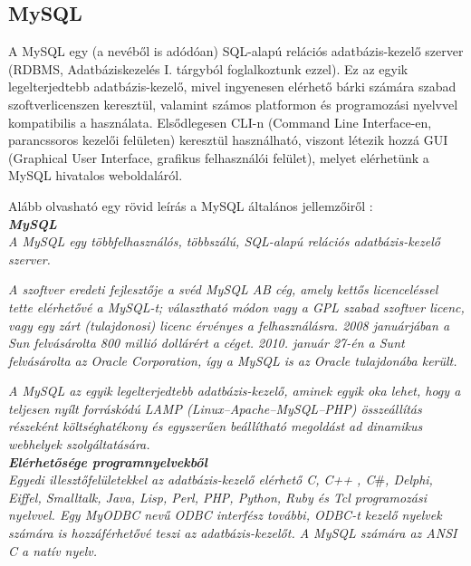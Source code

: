 
\subsection{MySQL}

A MySQL egy (a nevéből is adódóan) SQL-alapú relációs adatbázis-kezelő szerver (RDBMS, Adatbáziskezelés I. tárgyból foglalkoztunk ezzel).
Ez az egyik legelterjedtebb adatbázis-kezelő, mivel ingyenesen elérhető bárki számára szabad szoftverlicenszen keresztül, valamint számos platformon és programozási nyelvvel kompatibilis a használata.
Elsődlegesen CLI-n (Command Line Interface-en, parancssoros kezelői felületen) keresztül használható, viszont létezik hozzá GUI (Graphical User Interface, grafikus felhasználói felület), melyet elérhetünk a MySQL hivatalos weboldaláról.

Alább olvasható egy rövid leírás a MySQL általános jellemzőiről \cite{mysqlcikk}:\\

\noindent\textit{\textbf{\large{MySQL}}}\\

\textit{A MySQL egy többfelhasználós, többszálú, SQL-alapú relációs adatbázis-kezelő szerver.}

\textit{A szoftver eredeti fejlesztője a svéd MySQL AB cég, amely kettős licenceléssel tette elérhetővé a MySQL-t; választható módon vagy a GPL szabad szoftver licenc, vagy egy zárt (tulajdonosi) licenc érvényes a felhasználásra. 2008 januárjában a Sun felvásárolta 800 millió dollárért a céget. 2010. január 27-én a Sunt felvásárolta az Oracle Corporation, így a MySQL is az Oracle tulajdonába került.}

\textit{A MySQL az egyik legelterjedtebb adatbázis-kezelő, aminek egyik oka lehet, hogy a teljesen nyílt forráskódú LAMP (Linux–Apache–MySQL–PHP) összeállítás részeként költséghatékony és egyszerűen beállítható megoldást ad dinamikus webhelyek szolgáltatására.}\\

\noindent\textit{\textbf{Elérhetősége programnyelvekből}}\\

\textit{Egyedi illesztőfelületekkel az adatbázis-kezelő elérhető C, C++ , C}\#\textit{, Delphi, Eiffel, Smalltalk, Java, Lisp, Perl, PHP, Python, Ruby és Tcl programozási nyelvvel. Egy MyODBC nevű ODBC interfész további, ODBC-t kezelő nyelvek számára is hozzáférhetővé teszi az adatbázis-kezelőt. A MySQL számára az ANSI C a natív nyelv.}\\

